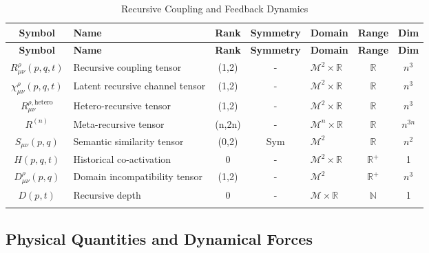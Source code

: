 {\small
\renewcommand{\arraystretch}{1.1}
\begin{longtable}{|c|p{5.5cm}|c|c|p{1.8cm}|c|c|}
\hline
\textbf{Symbol} & \textbf{Name} & \textbf{Rank} & \textbf{Symmetry} & \textbf{Domain} & \textbf{Range} & \textbf{Dim} \\
\hline
\endfirsthead
\hline
\textbf{Symbol} & \textbf{Name} & \textbf{Rank} & \textbf{Symmetry} & \textbf{Domain} & \textbf{Range} & \textbf{Dim} \\
\hline
\endhead
\(R^\rho_{\mu\nu}(p,q,t)\) & Recursive coupling tensor & (1,2) & - & \(\mathcal{M}^2 \times \mathbb{R}\) & \(\mathbb{R}\) & \(n^3\) \\
\hline
\(\chi^\rho_{\mu\nu}(p,q,t)\) & Latent recursive channel tensor & (1,2) & - & \(\mathcal{M}^2 \times \mathbb{R}\) & \(\mathbb{R}\) & \(n^3\) \\
\hline
\(R^{\rho, \text{hetero}}_{\mu\nu}\) & Hetero-recursive tensor & (1,2) & - & \(\mathcal{M}^2 \times \mathbb{R}\) & \(\mathbb{R}\) & \(n^3\) \\
\hline
\(R^{(n)}\) & Meta-recursive tensor & (n,2n) & - & \(\mathcal{M}^n \times \mathbb{R}\) & \(\mathbb{R}\) & \(n^{3n}\) \\
\hline
\(S_{\mu\nu}(p,q)\) & Semantic similarity tensor\footnotemark[2] & (0,2) & Sym & \(\mathcal{M}^2\) & \(\mathbb{R}\) & \(n^2\) \\
\hline
\(H(p,q,t)\) & Historical co-activation\footnotemark[3] & 0 & - & \(\mathcal{M}^2 \times \mathbb{R}\) & \(\mathbb{R}^+\) & 1 \\
\hline
\(D^\rho_{\mu\nu}(p,q)\) & Domain incompatibility tensor & (1,2) & - & \(\mathcal{M}^2\) & \(\mathbb{R}^+\) & \(n^3\) \\
\hline
\(D(p,t)\) & Recursive depth & 0 & - & \(\mathcal{M} \times \mathbb{R}\) & \(\mathbb{N}\) & 1 \\
\hline
\caption{Recursive Coupling and Feedback Dynamics}
\end{longtable}
}


\subsection{Physical Quantities and Dynamical Forces}
\label{2.2.4:physical_quantities_and_dynamical_forces}

